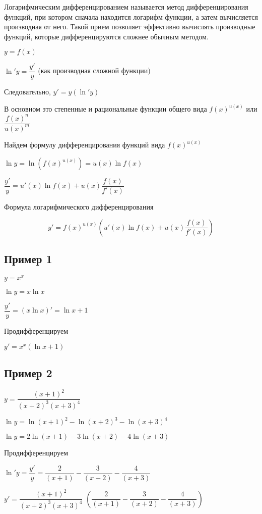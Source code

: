 Логарифмическим дифференцированием называется метод дифференцирования функций, при котором сначала находится логарифм функции, а затем вычисляется производная от него. Такой прием позволяет эффективно вычислять производные функций, которые дифференцируются сложнее обычным методом.

$ y = f(x) $

$ \ln ' y = \dfrac{y'}{y} $ (как производная сложной функции)

Следовательно, $ y' = y(\ln' y) $

В основном это степенные и рациональные функции общего вида $ f(x)^{u(x)} $ или $ \dfrac{f(x)^{n}}{u(x)^{m}} $ 

Найдем формулу дифференцирования функций вида $ f(x)^{u(x)} $

$ \ln y = \ln (f(x)^{u(x)}) = u(x) \ln f(x)  $

$ \dfrac{y'}{y} = u'(x) \ln f(x) + u(x) \dfrac{f(x)}{f'(x)} $

Формула логарифмического дифференцирования

$$
y' = f(x)^{u(x)} \left( u'(x) \ln f(x) + u(x) \dfrac{f(x)}{f'(x)} \right)  
$$

\subsection{Пример 1}

$ y = x^{x} $

$ \ln y = x \ln x $

$ \dfrac{y'}{y} = (x \ln x)' = \ln x + 1 $

Продифференцируем

$ y' = x^{x}(\ln x + 1) $

\subsection{Пример 2}

$ y = \dfrac{(x+1)^{2}}{(x+2)^{3}(x+3)^{4}} $

$ \ln y = \ln{(x+1)^{2}} - \ln {(x+2)^{3}} - \ln {(x+3)^{4}} $

$ \ln y = 2 \ln{(x+1)} - 3 \ln {(x+2)} - 4 \ln {(x+3)} $

Продифференцируем

$ \ln ' y = \dfrac{y'}{y} = \dfrac{2}{(x+1)} - \dfrac{3}{(x+2)} - \dfrac{4}{(x+3)} $

$ y ' = \dfrac{(x+1)^{2}}{(x+2)^{3}(x+3)^{4}}$
$\left(  \dfrac{2}{(x+1)} - \dfrac{3}{(x+2)} - \dfrac{4}{(x+3)} \right)  $

